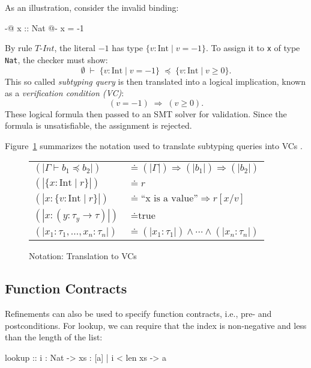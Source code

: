 As an illustration, consider the invalid binding:

\begin{code}
	{-@ x :: Nat @-}
	x = -1
\end{code}

By rule \(\mathit{T\text{-}Int}\), the literal \(-1\) has type
\(\{ v:\mathrm{Int} \mid v = -1 \}\). To assign it to \texttt{x} of type \texttt{Nat}, the
checker must show:
\[
	\emptyset \;\vdash\; \{ v:\mathrm{Int} \mid v = -1 \} \;\preceq\;
	\{ v:\mathrm{Int} \mid v \geq 0 \}.
\]
This so called \emph{subtyping query} is then translated into a logical implication, known
as a \emph{verification condition (VC)}:
\[
	(v = -1) \;\Rightarrow\; (v \geq 0).
\]
These logical formula then passed to an SMT solver for validation.
Since the formula is unsatisfiable, the assignment is rejected.

Figure~\ref{fig:notation} summarizes the notation used to translate subtyping
queries into VCs \cite{vazou2014}.
\begin{figure}[htbp]
	\centering
	\renewcommand{\arraystretch}{1.4}
	\begin{tabular}{@{}ll@{}}
		\( (|\Gamma \vdash b_1 \preceq b_2|) \) & \( \doteq (|\Gamma|) \Rightarrow (|b_1|) \Rightarrow (|b_2|) \) \\[1ex]
		\( (|\{x:\mathrm{Int} \mid r\}|) \)     & \( \doteq r \)                                                  \\[1ex]
		\( (|x:\{v:\mathrm{Int} \mid r\}|) \)   & \( \doteq \text{``x is a value''} \Rightarrow r[x/v] \)         \\[1ex]
		\( (|x:(y:\tau_y \to \tau)|) \)         & \( \doteq \text{true} \)                                        \\[1ex]
		\( (|x_1:\tau_1,\ldots,x_n:\tau_n|) \)  & \( \doteq (|x_1:\tau_1|) \land \cdots \land (|x_n:\tau_n|) \)
	\end{tabular}
	\caption{Notation: Translation to VCs \cite{vazou2014}}
	\label{fig:notation}
\end{figure}
\subsection{Function Contracts}
Refinements can also be used to specify function contracts, i.e., pre- and
postconditions. For lookup, we can require that the index is non-negative and
less than the length of the list:

\begin{code}
	lookup :: i : Nat -> xs : {[a] | i < len xs} -> a
\end{code}

